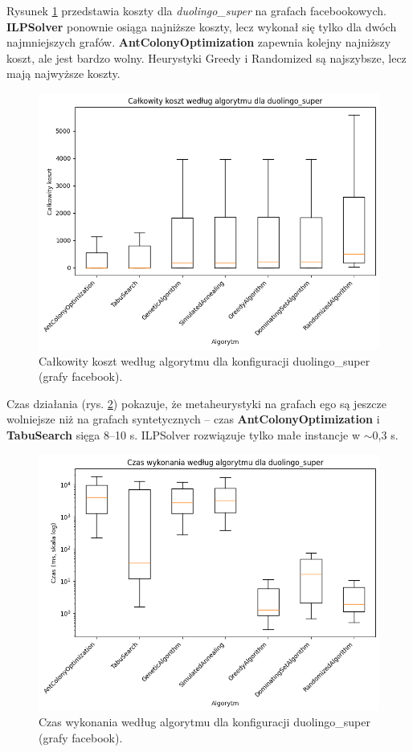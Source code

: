 Rysunek \ref{fig:facebook_cost_boxplot} przedstawia koszty dla \emph{duolingo\_super} na grafach facebookowych. \textbf{ILPSolver} ponownie osiąga najniższe koszty, lecz wykonał się tylko dla dwóch najmniejszych grafów. \textbf{AntColonyOptimization} zapewnia kolejny najniższy koszt, ale jest bardzo wolny. Heurystyki Greedy i Randomized są najszybsze, lecz mają najwyższe koszty.

\begin{figure}[H]
  \centering
  \includegraphics[width=0.7\linewidth]{assets/figures/facebook_cost_boxplot.png}
  \caption{Całkowity koszt według algorytmu dla konfiguracji duolingo\_super (grafy facebook).}
  \label{fig:facebook_cost_boxplot}
\end{figure}

Czas działania (rys. \ref{fig:facebook_time_boxplot}) pokazuje, że metaheurystyki na grafach ego są jeszcze wolniejsze niż na grafach syntetycznych -- czas \textbf{AntColonyOptimization} i \textbf{TabuSearch} sięga 8--10 s. ILPSolver rozwiązuje tylko małe instancje w $\sim$0,3 s.

\begin{figure}[H]
  \centering
  \includegraphics[width=0.7\linewidth]{assets/figures/facebook_time_boxplot.png}
  \caption{Czas wykonania według algorytmu dla konfiguracji duolingo\_super (grafy facebook).}
  \label{fig:facebook_time_boxplot}
\end{figure}

